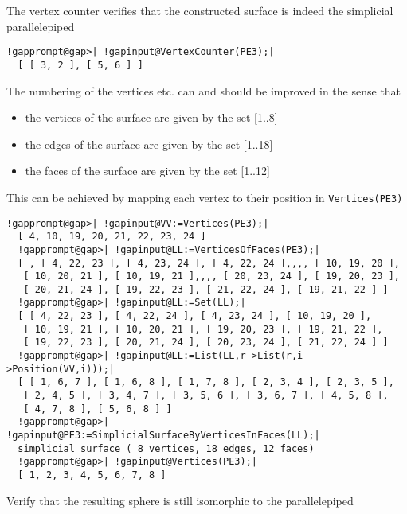 \documentclass[a4paper,11pt]{report}
\begin{document}
{{{ 
\begin{center}

\end{center}
 

 The vertex counter verifies that the constructed surface is indeed the
simplicial parallelepiped 

 
\begin{Verbatim}[commandchars=!@|,fontsize=\small,frame=single,label=Example]
  !gapprompt@gap>| !gapinput@VertexCounter(PE3);|
  [ [ 3, 2 ], [ 5, 6 ] ]
\end{Verbatim}
 

 The numbering of the vertices etc. can and should be improved in the sense
that 
\begin{itemize}
\item  the vertices of the surface are given by the set [1..8] 
\item  the edges of the surface are given by the set [1..18] 
\item  the faces of the surface are given by the set [1..12] 
\end{itemize}
 This can be achieved by mapping each vertex to their position in \texttt{Vertices(PE3)} 
\begin{Verbatim}[commandchars=!@|,fontsize=\small,frame=single,label=Example]
  !gapprompt@gap>| !gapinput@VV:=Vertices(PE3);|
  [ 4, 10, 19, 20, 21, 22, 23, 24 ]
  !gapprompt@gap>| !gapinput@LL:=VerticesOfFaces(PE3);|
  [ , [ 4, 22, 23 ], [ 4, 23, 24 ], [ 4, 22, 24 ],,,, [ 10, 19, 20 ], 
   [ 10, 20, 21 ], [ 10, 19, 21 ],,,, [ 20, 23, 24 ], [ 19, 20, 23 ], 
   [ 20, 21, 24 ], [ 19, 22, 23 ], [ 21, 22, 24 ], [ 19, 21, 22 ] ]
  !gapprompt@gap>| !gapinput@LL:=Set(LL);|
  [ [ 4, 22, 23 ], [ 4, 22, 24 ], [ 4, 23, 24 ], [ 10, 19, 20 ], 
   [ 10, 19, 21 ], [ 10, 20, 21 ], [ 19, 20, 23 ], [ 19, 21, 22 ], 
   [ 19, 22, 23 ], [ 20, 21, 24 ], [ 20, 23, 24 ], [ 21, 22, 24 ] ]
  !gapprompt@gap>| !gapinput@LL:=List(LL,r->List(r,i->Position(VV,i)));|
  [ [ 1, 6, 7 ], [ 1, 6, 8 ], [ 1, 7, 8 ], [ 2, 3, 4 ], [ 2, 3, 5 ], 
   [ 2, 4, 5 ], [ 3, 4, 7 ], [ 3, 5, 6 ], [ 3, 6, 7 ], [ 4, 5, 8 ], 
   [ 4, 7, 8 ], [ 5, 6, 8 ] ]
  !gapprompt@gap>| !gapinput@PE3:=SimplicialSurfaceByVerticesInFaces(LL);|
  simplicial surface ( 8 vertices, 18 edges, 12 faces)
  !gapprompt@gap>| !gapinput@Vertices(PE3);|
  [ 1, 2, 3, 4, 5, 6, 7, 8 ]
\end{Verbatim}
 

 Verify that the resulting sphere is still isomorphic to the parallelepiped 

}}}
\end{document}
